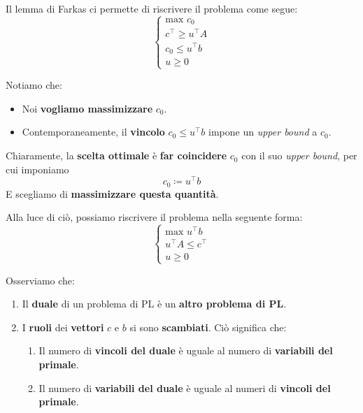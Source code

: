 Il lemma di Farkas ci permette di riscrivere il problema come segue:
\[
    \begin{cases}
        \text{max } c_{0} \\ 
        c^\top \ge u^\top A \\
        c_{0} \le u^\top b \\ 
        u \ge 0
    \end{cases}
\]

\begin{remark} 
    Notiamo che:
    \begin{itemize}
        \item Noi \textbf{vogliamo massimizzare} $c_{0}$.
        \item Contemporaneamente, il \textbf{vincolo} $c_{0} \le u^\top b$ 
            impone un \textit{upper bound} a $c_{0}$. 
    \end{itemize}
    Chiaramente, la \textbf{scelta ottimale} è \textbf{far coincidere}
    $c_{0}$ con il suo \textit{upper bound}, per cui imponiamo
    \[
        c_{0} \coloneqq u^\top b
    \] 
    E scegliamo di \textbf{massimizzare questa quantità}.
\end{remark}

Alla luce di ciò, possiamo riscrivere il problema nella seguente forma:
\[
    \begin{cases}
        \text{max } u^\top b \\ 
        u^\top A \le c^\top \\ 
        u \ge 0
    \end{cases}
\]

\begin{remark}
    Osserviamo che:
    \begin{enumerate}
        \item Il \textbf{duale} di un problema di PL è un \textbf{altro problema di PL}.
        \item I \textbf{ruoli} dei \textbf{vettori} $c$ e $b$ si sono \textbf{scambiati}.
            Ciò significa che:
            \begin{enumerate}
                \item Il numero di \textbf{vincoli del duale} è uguale
                    al numero di \textbf{variabili del primale}.
                \item Il numero di \textbf{variabili del duale} è uguale
                    al numeri di \textbf{vincoli del primale}.
            \end{enumerate}
    \end{enumerate}
\end{remark}

